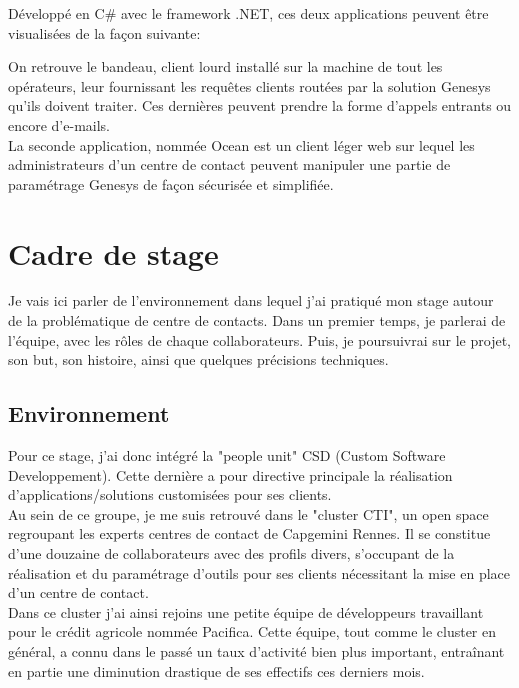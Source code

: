 \documentclass{rapport}
\begin{document}
Développé en C\# avec le framework .NET, ces deux applications peuvent être visualisées de la façon suivante:


On retrouve le bandeau, client lourd installé sur la machine de tout les opérateurs, leur fournissant les requêtes clients routées par la solution Genesys qu'ils doivent traiter. Ces dernières peuvent prendre la forme d'appels entrants ou encore d'e-mails.\\

La seconde application, nommée Ocean est un client léger web sur lequel les administrateurs d'un centre de contact peuvent manipuler une partie de paramétrage Genesys de façon sécurisée et simplifiée.

\newpage

\section{Cadre de stage}

Je vais ici parler de l'environnement dans lequel j'ai pratiqué mon stage autour de la problématique de centre de contacts.
Dans un premier temps, je parlerai de l'équipe, avec les rôles de chaque collaborateurs. Puis, je poursuivrai sur le projet, son but, son histoire, ainsi que quelques précisions techniques.

\subsection{Environnement}

Pour ce stage, j'ai donc intégré la "people unit" CSD (Custom Software Developpement). Cette dernière a pour directive principale la réalisation d'applications/solutions customisées pour ses clients.\\

Au sein de ce groupe, je me suis retrouvé dans le "cluster CTI", un open space regroupant les experts centres de contact de Capgemini Rennes. Il se constitue d'une douzaine de collaborateurs avec des profils divers, s'occupant de la réalisation et du paramétrage d'outils pour ses clients nécessitant la mise en place d'un centre de contact.\\

Dans ce cluster j'ai ainsi rejoins une petite équipe de développeurs travaillant pour le crédit agricole nommée Pacifica. Cette équipe, tout comme le cluster en général, a connu dans le passé un taux d'activité bien plus important, entraînant en partie une diminution drastique de ses effectifs ces derniers mois.
\end{document}
